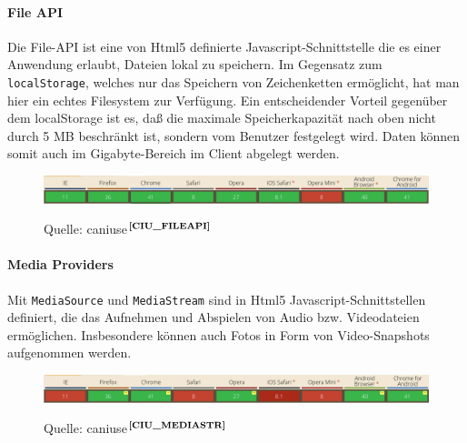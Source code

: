 \paragraph{File API}
Die File-API ist eine von Html5 definierte Javascript-Schnittstelle die es einer Anwendung erlaubt, Dateien lokal zu speichern. Im Gegensatz zum \texttt{localStorage}, welches nur das Speichern von Zeichenketten ermöglicht, hat man hier ein echtes Filesystem zur Verfügung. Ein entscheidender Vorteil gegenüber dem localStorage ist es, daß die maximale Speicherkapazität nach oben nicht durch 5 MB beschränkt ist, sondern vom Benutzer festgelegt wird. Daten können somit auch im Gigabyte-Bereich im Client abgelegt werden.
  \begin{figure}[H]
  \begin{adjustwidth}{-1.5cm}{1.5cm}
      \centering
          \includegraphics[scale=0.6]{bilder/screenshots/caniuse_fileapi.png}\\ 
          \caption{Quelle: caniuse$^{\textbf{\ref{CIU_FILEAPI}}}$}
  \end{adjustwidth}
  \end{figure}
\addtocounter{footnote}{1}%

\paragraph{Media Providers}
Mit \texttt{MediaSource} und \texttt{MediaStream} sind in Html5 Javascript-Schnittstellen definiert, die das Aufnehmen und Abspielen von Audio bzw. Videodateien ermöglichen. Insbesondere können auch Fotos in Form von Video-Snapshots aufgenommen werden.
  \begin{figure}[H]
  \begin{adjustwidth}{-1.5cm}{1.5cm}
      \centering
          \includegraphics[scale=0.6]{bilder/screenshots/caniuse_mediastream.png}\\ 
          \caption{Quelle: caniuse$^{\textbf{\ref{CIU_MEDIASTR}}}$}
  \end{adjustwidth}
  \end{figure}
\addtocounter{footnote}{1}%

